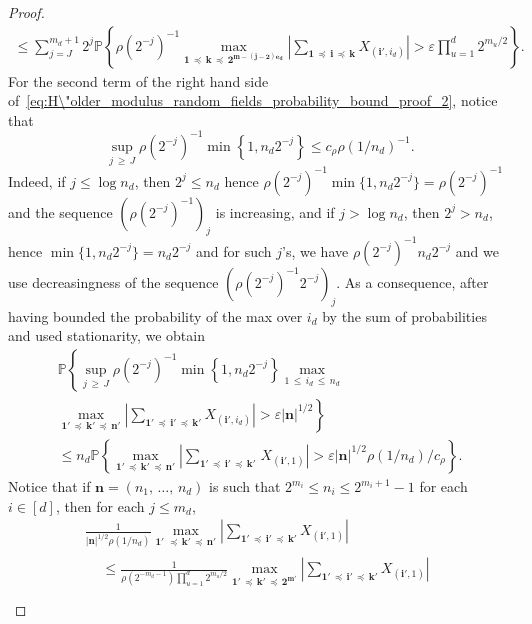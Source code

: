 \documentclass[10pt]{amsart}
\theoremstyle{definition}\newtheorem{defi}[theo]{Definition}\newtheorem{rema}[theo]{Remark}\newtheorem{exam}[theo]{Example}\newtheorem{exem}[theo]{Example}\newtheorem{nota}[theo]{Notation}
\newcommand\PP{\mathbb{P}}
\newcommand\abs[1]{|#1|}
\newcommand{\pr}[1]{(#1)}
\newcommand\eps{\varepsilon}
\newcommand{\gr}[1]{\bm{#1}}
\newcommand{\grn}{\bm{n}}
\newcommand{\grm}{\bm{m}}
\newcommand{\imd}{\preccurlyeq}
\begin{document}
\begin{proof}
\begin{multline}
\leq \sum_{j=J}^{m_d+1}2^j
\PP\left\{\rho\left(2^{-j}\right)^{-1}
\max_{\gr{1}\,\imd\,\gr{k}\,\imd\,\gr{2^{\grm-
\pr{j-2}\gr{e_d}}} }
\left|
\sum_{\gr{1}\,\imd\,\gr{i}\,\imd\,\gr{k}} X_{\left(\gr{i'},i_d\right) } \right|>\eps \prod_{u=1}^d 2^{m_u/2} \right\}.
\end{multline}
For the second term of the right hand side of~\eqref{eq:H\"older_modulus_random_fields_probability_bound_proof_2}, notice that
\begin{equation}
\sup_{j\,\geqslant\,J}\rho\left(2^{-j}\right)^{-1}\min\left\{1,n_d2^{-j}\right\}\leq c_\rho
\rho\pr{1/n_d}^{-1}.
\end{equation}
Indeed, if $j\leq \log n_d$, then $2^j\leq n_d$ hence $\rho\pr{2^{-j}}^{-1}\min\{1,n_d2^{-j}\}=\rho\pr{2^{-j}}^{-1}$ and the sequence $\pr{\rho\pr{2^{-j}}^{-1}}_j$ is increasing, and if $j>\log n_d$, then $2^j>n_d$, hence $\min\{1,n_d2^{-j}\}=n_d2^{-j}$ and for such $j$'s, we have $\rho\pr{2^{-j}}^{-1}n_d2^{-j}$ and we use decreasingness of the sequence $\pr{\rho\pr{2^{-j}}^{-1}2^{-j}}_j$. As a consequence, after having bounded the probability of the max over $i_d$ by the sum of probabilities and used stationarity, we obtain
\begin{multline}
\PP\left\{\sup_{j\,\geqslant\,J}\rho\left(2^{-j}\right)^{-1}
\min\left\{1,n_d2^{-j}\right\}\max_{1\,\leq\,i_d\,\leq\, n_d}\right.\\
\left.\max_{\gr{1'}\,\imd\,\gr{k'}\,\imd\,\gr{n'}} \left|
\sum_{\gr{1'}\,\imd\,\gr{i'}\,\imd\,\gr{k'}} X_{\left(\gr{i'},i_d\right) }\right|>\eps\abs{\grn}^{1/2}\right\}\\
\leq n_d
\PP\left\{ \max_{\gr{1'}\,\imd\,\gr{k'}\,\imd\,\gr{n'}} \left|
\sum_{\gr{1'}\,\imd\,\gr{i'}\,\imd\,\gr{k'}\,} X_{\left(\gr{i'},1\right)}\right|>\eps\abs{\grn}^{1/2}\rho\pr{1/n_d} /c_{\rho}\right\}.
\end{multline}
Notice that if $\grn =\pr{n_1,\,\dots,\,n_d}$ is such that $2^{m_i}\leq n_i\leq 2^{m_i+1}-1$ for each $i\in [d]$, then for each $j\leq m_d$,
\begin{multline*}
\frac{1}{\abs{\grn}^{1/2}\rho\pr{1/n_d}}\max_{\gr{1'}\,\,\imd\,\gr{k'}\,\imd\,\gr{n'}}
\left|
\sum_{\gr{1'}\,\imd\,\gr{i'}\,\imd\,\gr{k'}} X_{\left(\gr{i'},1\right)}\right|\\
\begin{aligned}
&\leq
\frac{1}{\rho\left(2^{-m_{d}-1}\right)\prod_{u=1}^d2^{m_u/2}}
\max_{\gr{1'}\,\imd\,\gr{k'}\,\imd
\,\gr{2^{m'}}}\left|\sum_{\gr{1'}\,\imd\,\gr{i'}\,\imd\,\gr{k'}} X_{\left(\gr{i'},1\right)}\right|\\

\end{aligned}
\end{multline*}
\end{proof}
\end{document}
